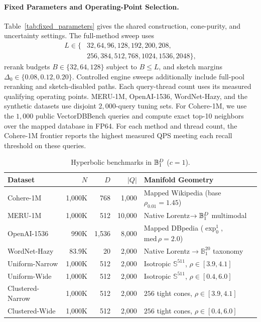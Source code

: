 \paragraph{Fixed Parameters and Operating-Point Selection.}
Table~\ref{tab:fixed_parameters} gives the shared construction, cone-purity, and uncertainty settings. The full-method sweep uses
\[
 \begin{aligned}
 L\in\{&32,64,96,128,192,200,208,\\
       &256,384,512,768,1024,1536,2048\},
 \end{aligned}
\]
rerank budgets $B\in\{32,64,128\}$ subject to $B\le L$, and sketch margins $\Delta_0\in\{0.08,0.12,0.20\}$. Controlled engine sweeps additionally include full-pool reranking and sketch-disabled paths. Each query-thread count uses its measured qualifying operating points.
{MERU-1M}, {OpenAI-1536}, {WordNet-Hazy}, and the synthetic datasets use disjoint $2{,}000$-query tuning sets. For {Cohere-1M}, we use the $1{,}000$ public {VectorDBBench} queries and compute exact top-10 neighbors over the mapped database in FP64. For each method and thread count, the {Cohere-1M} frontier reports the highest measured QPS meeting each recall threshold on these queries.

\begin{table}[t]
  \centering
  \caption{Hyperbolic benchmarks in $\mathbb{B}_1^D$ ($c=1$).}
  \label{tab:datasets}
  \small
  \setlength{\tabcolsep}{3.5pt}
  \begin{tabularx}{\linewidth}{@{}lrrr>{\raggedright\arraybackslash}X@{}}
    \toprule
    \textbf{Dataset} & $N$ & $D$ & $|Q|$ & \textbf{Manifold Geometry} \\
    \midrule
    Cohere-1M & 1,000K & 768 & 1,000 & Mapped Wikipedia (base $\rho_{0.01}=1.45$) \\
    MERU-1M~\cite{astrmira2026meruimagenet1m} & 1,000K & 512 & 10,000 & Native {Lorentz}$\to\mathbb{B}_1^D$ multimodal \\
    OpenAI-1536 & 990K & 1,536 & 8,000 & Mapped DBpedia ($\exp_0^1$, $\text{med}\,\rho=2.0$) \\
    WordNet-Hazy & 83.9K & 20 & 2,000 & Native {Lorentz}$\to\mathbb{B}_1^{20}$ taxonomy \\
    \midrule
    Uniform-Narrow & 1,000K & 512 & 2,000 & Isotropic $\mathbb{S}^{511}$, $\rho \in [3.9, 4.1]$ \\
    Uniform-Wide & 1,000K & 512 & 2,000 & Isotropic $\mathbb{S}^{511}$, $\rho \in [0.4, 6.0]$ \\
    Clustered-Narrow & 1,000K & 512 & 2,000 & $256$ tight cones, $\rho \in [3.9, 4.1]$ \\
    Clustered-Wide & 1,000K & 512 & 2,000 & $256$ tight cones, $\rho \in [0.4, 6.0]$ \\
    \bottomrule
  \end{tabularx}
\end{table}

